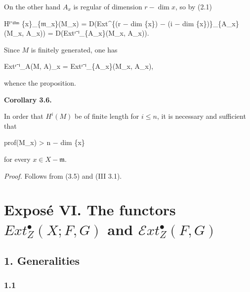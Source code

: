 \documentclass[
  11pt,
  a4paper,
]{book}
\newenvironment{Shaded}{}{}
\newcommand{\NormalTok}[1]{#1}
\begin{document}
On the other hand \(A_{x}\) is regular of dimension \(r - \dim {x}\), so
by (2.1)

\begin{Shaded}
\begin{Highlighting}[]
\NormalTok{Hⁱ⁻ᵈⁱᵐ \{x\}\_\{𝔪\_x\}(M\_x) = D(Ext\^{}\{(r − dim \{x\}) − (i − dim \{x\})\}\_\{A\_x\}(M\_x, A\_x)) = D(Extʳ⁻ⁱ\_\{A\_x\}(M\_x, A\_x)).}
\end{Highlighting}
\end{Shaded}

Since \(M\) is finitely generated, one has

\begin{Shaded}
\begin{Highlighting}[]
\NormalTok{Extʳ⁻ⁱ\_A(M, A)\_x = Extʳ⁻ⁱ\_\{A\_x\}(M\_x, A\_x),}
\end{Highlighting}
\end{Shaded}

whence the proposition.

\textbf{Corollary 3.6.}

In order that \(H^{i}(M)\) be of finite length for \(i \leqslant n\), it
is necessary and sufficient that

\begin{Shaded}
\begin{Highlighting}[]
\NormalTok{prof(M\_x) \textgreater{} n − dim \{x\}}
\end{Highlighting}
\end{Shaded}

for every \(x \in X - {\mathfrak{m}}\).

\emph{Proof.} Follows from (3.5) and (III 3.1).

\chapter{\texorpdfstring{Exposé VI. The functors
\(Ext^{\bullet}_{Z}(X; F, G)\) and
\(\mathcal{E}xt^{\bullet}_{Z}(F, G)\)}{Exposé VI. The functors Ext\^{}\{\textbackslash bullet\}\_\{Z\}(X; F, G) and \textbackslash mathcal\{E\}xt\^{}\{\textbackslash bullet\}\_\{Z\}(F, G)}}\label{exposuxe9-vi.-the-functors-extbullet_zx-f-g-and-mathcalextbullet_zf-g}

\section{1. Generalities}\label{generalities}

\subsection{1.1}\label{section}
\end{document}
